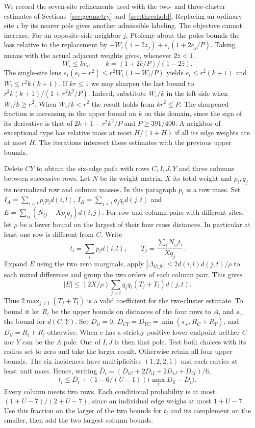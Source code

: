 \documentclass[11pt,a4paper]{article}
\theoremstyle{definition}
\begin{document}
We record the seven-site refinements used with the two- and three-cluster
estimates of Sections~\ref{sec:geometry} and~\ref{sec:threshold}. Replacing
an ordinary site $i$ by its nearer pole gives another admissible labeling.
The objective cannot increase. For an opposite-side neighbor $j$, Ptolemy
about the poles bounds the loss relative to the replacement by
$-W_i(1-2z_j)+e_i(1+2e_j/P)$. Taking means with the actual adjacent
weights gives, whenever $2\bar z<1$,
\[
 W_i\le k e_i,\qquad k=(1+2\bar e/P)/(1-2\bar z).
\]
The single-site lens
$e_i(e_i-r^2)\le r^2W_i(1-W_i/P)$ yields $e_i\le r^2(k+1)$ and
$W_i\le r^2k(k+1)$. If $kr\le1$ we may sharpen the last bound to
$r^2k(k+1)/(1+r^2k^2/P)$. Indeed, substitute $W_i/k$ in the left
side when $W_i/k\ge r^2$. When $W_i/k<r^2$ the result holds from
$kr^2\le P$. The sharpened fraction is increasing in the upper bound on
$k$ on this domain, since the sign of its derivative is that of
$2k+1-r^2k^2/P$ and $P\ge391/400$. A neighbor of exceptional type has
relative mass at most $H/(1+H)$ if all its edge weights are at most $H$.
The iterations intersect these estimates with the previous upper bounds.

Delete $CY$ to obtain the six-edge path with rows $C,I,J,Y$ and three
columns between successive rows. Let $N$ be its weight matrix, $X$ its
total weight and $p_i,q_j$ its normalized row and column masses. In this
paragraph $p_i$ is a row mass. Set $I_A=\sum_{i<l}p_i p_l d(i,l)$,
$I_B=\sum_{j<t}q_j q_t d(j,t)$ and
$E=\sum_{ij}(N_{ij}-Xp_iq_j)d(i,j)$. For row and column pairs with
different sites, let $\rho$ be a lower bound on the largest of their
four cross distances. In particular at least one row is different from
$C$. Write
\[
 t_i=\sum_l p_l d(i,l),\qquad T_j=\frac{\sum_iN_{ij}t_i}{Xq_j}.
\]
Expand $E$ using the two zero marginals, apply
$|\Delta_{il;jt}|\le2d(i,l)d(j,t)/\rho$ to each mixed difference and group
the two orders of each column pair. This gives
\[
 |E|\le (2X/\rho)\sum_{j<t}q_jq_t(T_j+T_t)d(j,t).
\]
Thus $2\max_{j\ne t}(T_j+T_t)$ is a valid coefficient for the two-cluster
estimate. To bound it let $R_i$ be the upper bounds on distances of the four
rows to $A$, and $s_+$ the bound for $d(C,Y)$. Set $D_{ii}=0$,
$D_{CY}=D_{YC}=\min(s_+,R_C+R_Y)$, and $D_{il}=R_i+R_l$ otherwise.
When $v$ has a strictly positive lower endpoint neither $C$ nor $Y$ can
be the $A$ pole. One of $I,J$ is then that pole. Test both choices with
its radius set to zero and take the larger result. Otherwise retain all
four upper bounds. The six incidences have multiplicities $(1,2,2,1)$
and each carries at least unit mass. Hence, writing
$\bar D_i=(D_{iC}+2D_{iI}+2D_{iJ}+D_{iY})/6$,
\[
 t_i\le\bar D_i+
          (1-6/(U-1))\big(\max_l D_{il}-\bar D_i\big).
\]
Every column meets two rows. Each conditional probability is at most
$(1+U-7)/(2+U-7)$, since an individual edge weighs at most $1+U-7$.
Use this fraction on the larger of the two bounds for $t_i$ and its
complement on the smaller, then add the two largest column bounds.
\end{document}
